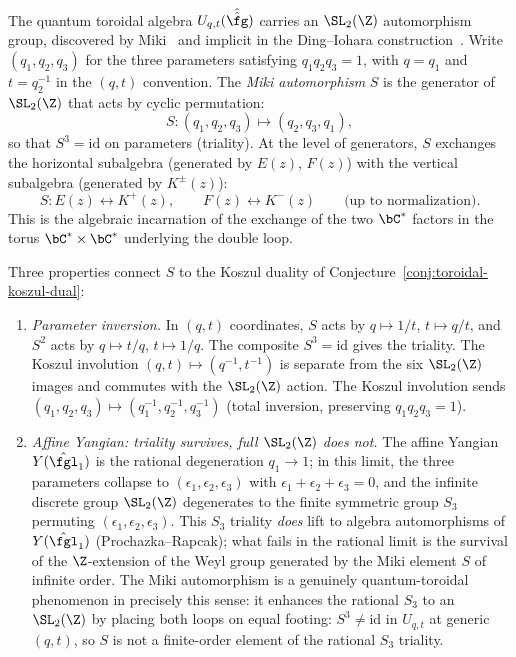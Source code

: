 \begin{remark}
\label{rem:miki-automorphism}
The quantum toroidal algebra $U_{q,t}(\hat{\hat{\fg}})$ carries an
$\SL_2(\Z)$ automorphism group, discovered by Miki~\cite{Miki07} and
implicit in the Ding--Iohara construction~\cite{DI97}. Write
$(q_1, q_2, q_3)$ for the three parameters satisfying $q_1 q_2 q_3 = 1$,
with $q = q_1$ and $t = q_2^{-1}$ in the $(q,t)$ convention. The
\emph{Miki automorphism} $S$ is the generator of $\SL_2(\Z)$ that acts
by cyclic permutation:
\[
 S \colon (q_1, q_2, q_3) \longmapsto (q_2, q_3, q_1),
\]
so that $S^3 = \mathrm{id}$ on parameters (triality). At the level of
generators, $S$ exchanges the horizontal subalgebra (generated by $E(z)$,
$F(z)$) with the vertical subalgebra (generated by $K^{\pm}(z)$):
\[
 S \colon E(z) \leftrightarrow K^+(z), \qquad
 F(z) \leftrightarrow K^-(z)
 \qquad \text{(up to normalization)}.
\]
This is the algebraic incarnation of the exchange of the two $\bC^*$
factors in the torus $\bC^* \times \bC^*$ underlying the double loop.

Three properties connect $S$ to the Koszul duality of
Conjecture~\ref{conj:toroidal-koszul-dual}:
\begin{enumerate}[label=\textup{(\alph*)}]
\item \emph{Parameter inversion.} In $(q,t)$ coordinates, $S$ acts by
 $q \mapsto 1/t$, $t \mapsto q/t$, and $S^2$ acts by
 $q \mapsto t/q$, $t \mapsto 1/q$. The composite $S^3 = \mathrm{id}$
 gives the triality. The Koszul involution $(q,t) \mapsto (q^{-1},t^{-1})$
 is separate from the six $\SL_2(\Z)$ images and commutes with the
 $\SL_2(\Z)$ action. The Koszul involution sends
 $(q_1,q_2,q_3) \mapsto (q_1^{-1},q_2^{-1},q_3^{-1})$ (total inversion,
 preserving $q_1 q_2 q_3 = 1$).

\item \emph{Affine Yangian: triality survives, full $\SL_2(\Z)$ does not.}
 The affine Yangian $Y(\hat{\fgl}_1)$ is the rational degeneration
 $q_1 \to 1$; in this limit, the three parameters collapse to
 $(\epsilon_1, \epsilon_2, \epsilon_3)$ with
 $\epsilon_1 + \epsilon_2 + \epsilon_3 = 0$, and the infinite discrete
 group $\SL_2(\Z)$ degenerates to the finite symmetric group $S_3$
 permuting $(\epsilon_1, \epsilon_2, \epsilon_3)$. This $S_3$ triality
 \emph{does} lift to algebra automorphisms of $Y(\hat{\fgl}_1)$
 (Prochazka--Rapcak); what fails in the rational limit is the survival
 of the $\Z$-extension of the Weyl group generated by the Miki element
 $S$ of infinite order. The Miki automorphism is a genuinely
 quantum-toroidal phenomenon in precisely this sense: it enhances the
rational $S_3$ to an $\SL_2(\Z)$ by placing both loops on equal
footing: $S^3 \neq \mathrm{id}$ in $U_{q,t}$ at generic $(q,t)$, so
$S$ is not a finite-order element of the rational $S_3$ triality.


\end{enumerate}
\end{remark}
